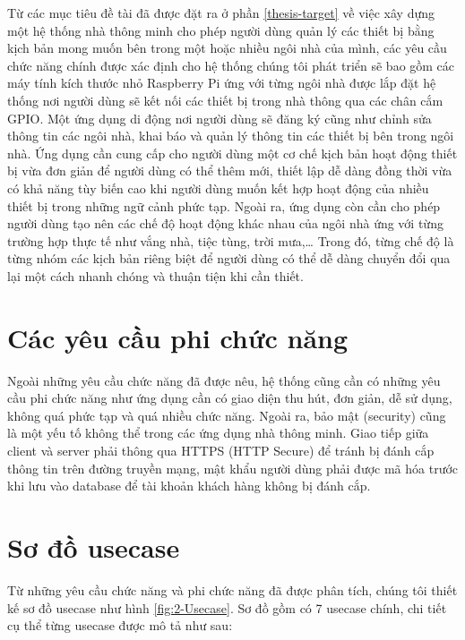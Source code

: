 \documentclass[12pt,a4paper,oneside]{extbook}
\begin{document}
Từ các mục tiêu đề tài đã được đặt ra ở phần \ref{thesis-target} về việc xây dựng một hệ thống nhà thông minh cho phép người dùng quản lý các thiết bị bằng kịch bản mong muốn bên trong một hoặc nhiều ngôi nhà của mình, các yêu cầu chức năng chính được xác định cho hệ thống chúng tôi phát triển sẽ bao gồm các máy tính kích thước nhỏ Raspberry Pi ứng với từng ngôi nhà được lắp đặt hệ thống nơi người dùng sẽ kết nối các thiết bị trong nhà thông qua các chân cắm GPIO. Một ứng dụng di động nơi người dùng sẽ đăng ký cũng như chỉnh sửa thông tin các ngôi nhà, khai báo và quản lý thông tin các thiết bị bên trong ngôi nhà. Ứng dụng cần cung cấp cho người dùng một cơ chế kịch bản hoạt động thiết bị vừa đơn giản để người dùng có thể thêm mới, thiết lập dễ dàng đồng thời vừa có khả năng tùy biến cao khi người dùng muốn kết hợp hoạt động của nhiều thiết bị trong những ngữ cảnh phức tạp. Ngoài ra, ứng dụng còn cần cho phép người dùng tạo nên các chế độ hoạt động khác nhau của ngôi nhà ứng với từng trường hợp thực tế như vắng nhà, tiệc tùng, trời mưa,\dots\hspace{0mm} Trong đó, từng chế độ là từng nhóm các kịch bản riêng biệt để người dùng có thể dễ dàng chuyển đổi qua lại một cách nhanh chóng và thuận tiện khi cần thiết.

\section{Các yêu cầu phi chức năng}

Ngoài những yêu cầu chức năng đã được nêu, hệ thống cũng cần có những yêu cầu phi chức năng như ứng dụng cần có giao diện thu hút, đơn giản, dễ sử dụng, không quá phức tạp và quá nhiều chức năng. Ngoài ra, bảo mật (security) cũng là một yếu tố không thể trong các ứng dụng nhà thông minh. Giao tiếp giữa client và server phải thông qua HTTPS (HTTP Secure) để tránh bị đánh cắp thông tin trên đường truyền mạng, mật khẩu người dùng phải được mã hóa trước khi lưu vào database để tài khoản khách hàng không bị đánh cắp.

\section{Sơ đồ usecase}

Từ những yêu cầu chức năng và phi chức năng đã được phân tích, chúng tôi thiết kế sơ đồ usecase như hình \ref{fig:2-Usecase}. Sơ đồ gồm có 7 usecase chính, chi tiết cụ thể từng usecase được mô tả như sau:
\end{document}
